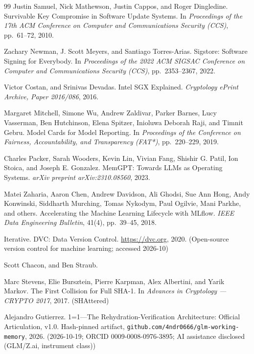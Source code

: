 \documentclass[11pt]{article}
\begin{document}
\begin{thebibliography}{99}
 Justin Samuel, Nick Mathewson, Justin Cappos, and Roger Dingledine. Survivable Key Compromise in Software Update Systems. In \emph{Proceedings of the 17th ACM Conference on Computer and Communications Security (CCS)}, pp.~61--72, 2010.

 Zachary Newman, J. Scott Meyers, and Santiago Torres-Arias. Sigstore: Software Signing for Everybody. In \emph{Proceedings of the 2022 ACM SIGSAC Conference on Computer and Communications Security (CCS)}, pp.~2353--2367, 2022.

 Victor Costan, and Srinivas Devadas. Intel {SGX} Explained. \emph{Cryptology ePrint Archive, Paper 2016/086}, 2016.

 Margaret Mitchell, Simone Wu, Andrew Zaldivar, Parker Barnes, Lucy Vasserman, Ben Hutchinson, Elena Spitzer, Inioluwa Deborah Raji, and Timnit Gebru. Model Cards for Model Reporting. In \emph{Proceedings of the Conference on Fairness, Accountability, and Transparency (FAT*)}, pp.~220--229, 2019.

 Charles Packer, Sarah Wooders, Kevin Lin, Vivian Fang, Shishir G. Patil, Ion Stoica, and Joseph E. Gonzalez. {MemGPT}: Towards {LLM}s as Operating Systems. \emph{arXiv preprint arXiv:2310.08560}, 2023.

 Matei Zaharia, Aaron Chen, Andrew Davidson, Ali Ghodsi, Sue Ann Hong, Andy Konwinski, Siddharth Murching, Tomas Nykodym, Paul Ogilvie, Mani Parkhe, and others. Accelerating the Machine Learning Lifecycle with {MLflow}. \emph{IEEE Data Engineering Bulletin}, 41(4), pp.~39--45, 2018.

 Iterative. {DVC}: Data Version Control. \url{https://dvc.org}, 2020. (Open-source version control for machine learning; accessed 2026-10)

 Scott Chacon, and Ben Straub. 

 Marc Stevens, Elie Bursztein, Pierre Karpman, Alex Albertini, and Yarik Markov. The First Collision for Full {SHA-1}. In \emph{Advances in Cryptology --- CRYPTO 2017}, 2017. (SHAttered)

 Alejandro Gutierrez. 1=1---The Rehydration-Verification Architecture: Official Articulation, v1.0. Hash-pinned artifact, \nolinkurl{github.com/4ndr0666/glm-working-memory}, 2026. (2026-10-19; ORCID 0009-0008-0976-3895; AI assistance disclosed (GLM/Z.ai, instrument class))

\end{thebibliography}
\end{document}
